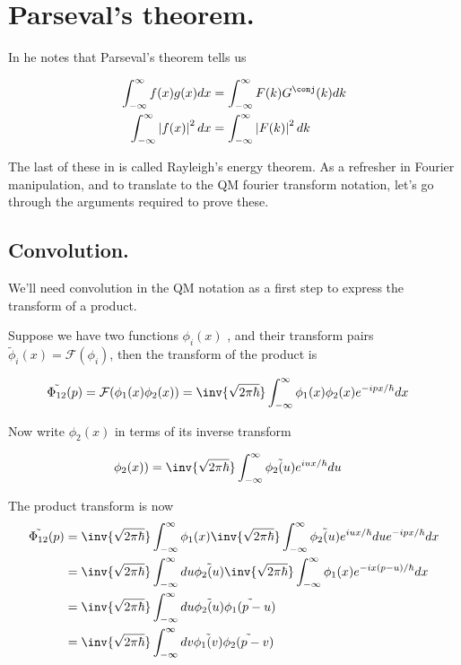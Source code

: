 \documentclass{article}
\newcommand{\FF}[0]{\mathcal{F}}
\newcommand{\FM}[0]{\inv{\sqrt{2\pi\hbar}}}
\newcommand{\Iinf}[1]{ \int_{-\infty}^\infty {#1}}
\begin{document}
\section{ Parseval's theorem. }

In \cite{mcmahon2005qmd} he notes that Parseval's theorem tells us

\begin{align*}
\Iinf{f(x)g(x) dx} &= \Iinf{F(k)G^\conj(k) dk} \\
\Iinf{\Abs{f(x)}^2 dx} &= \Iinf{\Abs{F(k)}^2 dk}
\end{align*}

The last of these in \cite{haykin1994cs} is called Rayleigh's energy theorem.  
As a refresher in 
Fourier manipulation, and to translate to the QM fourier transform notation, let's go through the arguments
required to prove these.

\subsection{ Convolution. }

We'll need convolution in the QM notation as a first step to express
the transform of a product.

Suppose we have two functions 
$\phi_i(x)$
, and their transform
pairs 
$\tilde{\phi}_i(x) = \FF(\phi_i)$, then the transform of the product is

\begin{align*}
\tilde{\Phi_{12}}(p) = \FF(\phi_1(x)\phi_2(x)) &= \FM \Iinf{\phi_1(x) \phi_2(x) e^{-ipx/\hbar} dx}
\end{align*}

Now write $\phi_2(x)$ in terms of its inverse transform

\begin{align*}
\phi_2(x)) &= \FM \Iinf{\tilde{\phi_2(u)} e^{iux/\hbar} du}
\end{align*}

The product transform is now
\begin{align*}
\tilde{\Phi_{12}}(p) 
&= \FM \Iinf{ \phi_1(x)             \FM \Iinf{\tilde{\phi_2(u)} e^{iux/\hbar} du} e^{-ipx/\hbar} dx} \\
&= \FM \Iinf{ du \tilde{\phi_2(u)}  \FM \Iinf{ \phi_1(x) e^{-ix(p-u)/\hbar} dx } } \\
&= \FM \Iinf{ du \tilde{\phi_2(u)}  \tilde{\phi_1(p-u)} } \\
&= \FM \Iinf{ dv \tilde{\phi_1(v)}  \tilde{\phi_2(p-v)} } \\
\end{align*}
\end{document}
